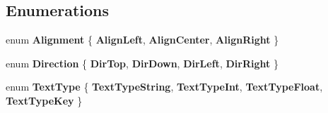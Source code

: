 \subsection*{Enumerations}
\begin{DoxyCompactItemize}
\item 
\mbox{\label{namespacetfp_a830afe4d34d5aece65b0ca6ab314ff55}} 
enum {\bfseries Alignment} \{ {\bfseries Align\+Left}, 
{\bfseries Align\+Center}, 
{\bfseries Align\+Right}
 \}
\item 
\mbox{\label{namespacetfp_abbe207404383a3069f9ce155ce91f007}} 
enum {\bfseries Direction} \{ {\bfseries Dir\+Top}, 
{\bfseries Dir\+Down}, 
{\bfseries Dir\+Left}, 
{\bfseries Dir\+Right}
 \}
\item 
\mbox{\label{namespacetfp_ac199658ccc07707523b27b2607e2682e}} 
enum {\bfseries Text\+Type} \{ {\bfseries Text\+Type\+String}, 
{\bfseries Text\+Type\+Int}, 
{\bfseries Text\+Type\+Float}, 
{\bfseries Text\+Type\+Key}
 \}
\end{DoxyCompactItemize}
